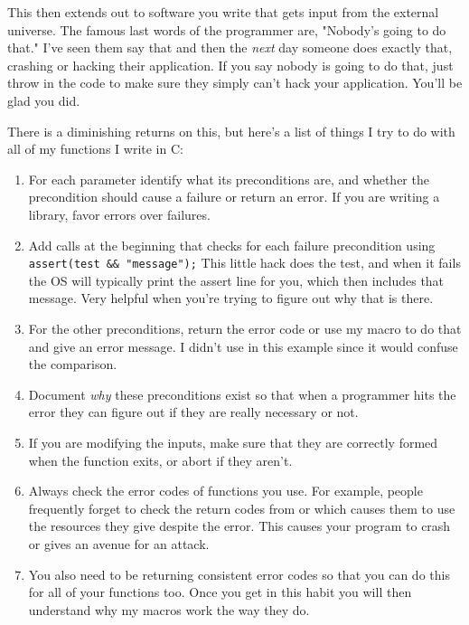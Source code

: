 This then extends out to software you write that gets input from the external
universe. The famous last words of the programmer are, "Nobody's going to 
do that."  I've seen them say that and then the \emph{next} day someone does
exactly that, crashing or hacking their application.  If you say nobody is
going to do that, just throw in the code to make sure they simply can't 
hack your application.  You'll be glad you did.

There is a diminishing returns on this, but here's a list of things I try
to do with all of my functions I write in C:

\begin{enumerate}
\item For each parameter identify what its preconditions are, and whether 
    the precondition should cause a failure or return an error.  If you
    are writing a library, favor errors over failures.
\item Add  calls at the beginning that checks for each 
    failure precondition using \verb|assert(test && "message");|  This little hack
    does the test, and when it fails the OS will typically print the assert
    line for you, which then includes that message.  Very helpful when you're
    trying to figure out why that  is there.
\item For the other preconditions, return the error code or use my 
    macro to do that and give an error message.  I didn't use  in
    this example since it would confuse the comparison.
\item Document \emph{why} these preconditions exist so that when a programmer
    hits the error they can figure out if they are really necessary or not.
\item If you are modifying the inputs, make sure that they are correctly formed
    when the function exits, or abort if they aren't.
\item Always check the error codes of functions you use.  For example, people
    frequently forget to check the return codes from  or 
    which causes them to use the resources they give despite the error.  This
    causes your program to crash or gives an avenue for an attack.
\item You also need to be returning consistent error codes so that you can do this
    for all of your functions too.  Once you get in this habit you will then
    understand why my  macros work the way they do.
\end{enumerate}

